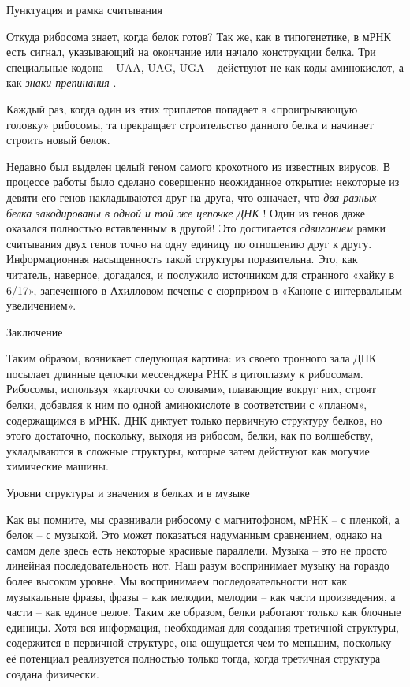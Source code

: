 \documentclass[../main.tex]{subfiles}
\begin{document}
Пунктуация и рамка считывания

Откуда рибосома знает, когда белок готов? Так же, как в типогенетике, в мРНК есть сигнал, указывающий на окончание или начало конструкции белка. Три специальные кодона \--- UAA, UAG, UGA \--- действуют не как коды аминокислот, а как \emph{знаки препинания} .

Каждый раз, когда один из этих триплетов попадает в «проигрывающую головку» рибосомы, та прекращает строительство данного белка и начинает строить новый белок.

Недавно был выделен целый геном самого крохотного из известных вирусов. В процессе работы было сделано совершенно неожиданное открытие: некоторые из девяти его генов накладываются друг на друга, что означает, что \emph{два разных белка закодированы в одной и той же цепочке ДНК} ! Один из генов даже оказался полностью вставленным в другой! Это достигается \emph{сдвиганием} рамки считывания двух генов точно на одну единицу по отношению друг к другу. Информационная насыщенность такой структуры поразительна. Это, как читатель, наверное, догадался, и послужило источником для странного «хайку в 6/17», запеченного в Ахилловом печенье с сюрпризом в «Каноне с интервальным увеличением».

Заключение

Таким образом, возникает следующая картина: из своего тронного зала ДНК посылает длинные цепочки мессенджера РНК в цитоплазму к рибосомам. Рибосомы, используя «карточки со словами», плавающие вокруг них, строят белки, добавляя к ним по одной аминокислоте в соответствии с «планом», содержащимся в мРНК\@. ДНК диктует только первичную структуру белков, но этого достаточно, поскольку, выходя из рибосом, белки, как по волшебству, укладываются в сложные структуры, которые затем действуют как могучие химические машины.

Уровни структуры и значения в белках и в музыке

Как вы помните, мы сравнивали рибосому с магнитофоном, мРНК \--- с пленкой, а белок \--- с музыкой. Это может показаться надуманным сравнением, однако на самом деле здесь есть некоторые красивые параллели. Музыка \--- это не просто линейная последовательность нот. Наш разум воспринимает музыку на гораздо более высоком уровне. Мы воспринимаем последовательности нот как музыкальные фразы, фразы \--- как мелодии, мелодии \--- как части произведения, а части \--- как единое целое. Таким же образом, белки работают только как блочные единицы. Хотя вся информация, необходимая для создания третичной структуры, содержится в первичной структуре, она ощущается чем-то меньшим, поскольку её потенциал реализуется полностью только тогда, когда третичная структура создана физически.
\end{document}
